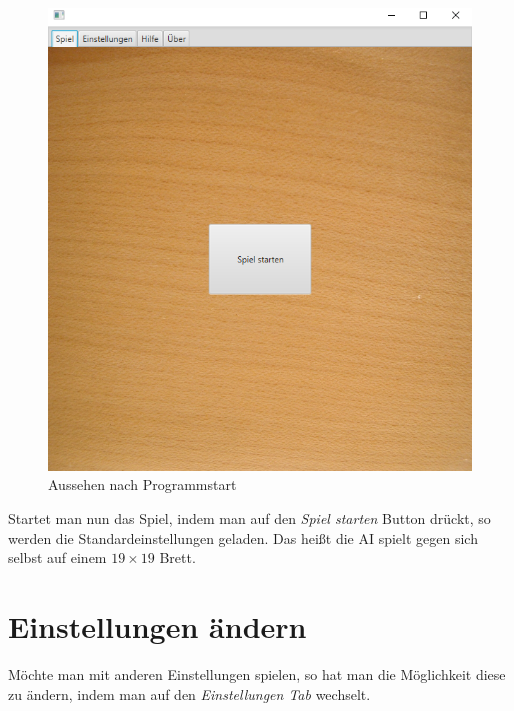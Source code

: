 \documentclass[11pt]{article}
\newcommand{\1}{{\mathds{1}}}
\newcommand{\imagewidth}{.8\linewidth}
\begin{document}
	\begin{figure}[H]
		\centering
		\includegraphics[width=\imagewidth]{starten.png}
		\caption{Aussehen nach Programmstart}
		\label{starten}
	\end{figure}
	
	Startet man nun das Spiel, indem man auf den \textit{Spiel starten} Button drückt, so werden die Standardeinstellungen geladen.
	Das heißt die AI spielt gegen sich selbst auf einem $19 \times 19$ Brett. 
	
	
	\section{Einstellungen ändern}
	Möchte man mit anderen Einstellungen spielen, so hat man die Möglichkeit diese zu ändern, indem man auf den \textit{Einstellungen Tab} wechselt. 
	
\end{document}
